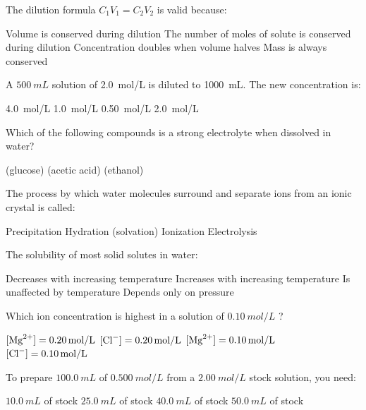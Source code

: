 \documentclass[addpoints]{exam}
\begin{document}
\begin{questions}
\question[1] The dilution formula $C_1V_1 = C_2V_2$ is valid because:
\begin{choices}
    \choice Volume is conserved during dilution
    \correctchoice The number of moles of solute is conserved during dilution
    \choice Concentration doubles when volume halves
    \choice Mass is always conserved
\end{choices}

\question[1] A $\SI{500}{mL}$ solution of \SI{2.0}{mol/L}  is diluted to
\SI{1000}{mL}. The new concentration is:
\begin{choices}
    \choice \SI{4.0}{mol/L}
    \correctchoice \SI{1.0}{mol/L}
    \choice \SI{0.50}{mol/L}
    \choice \SI{2.0}{mol/L}
\end{choices}

\question[1] Which of the following compounds is a strong electrolyte when dissolved in water?
\begin{choices}
    \choice {} (glucose)
    \choice {} (acetic acid)
    \correctchoice {}
    \choice {} (ethanol)
\end{choices}

\question[1] The process by which water molecules surround and separate ions from an ionic
crystal is called:
\begin{choices}
    \choice Precipitation
    \correctchoice Hydration (solvation)
    \choice Ionization
    \choice Electrolysis
\end{choices}

\question[1] The solubility of most solid solutes in water:
\begin{choices}
    \choice Decreases with increasing temperature
    \correctchoice Increases with increasing temperature
    \choice Is unaffected by temperature
    \choice Depends only on pressure
\end{choices}

\question[1] Which ion concentration is highest in a solution of $\SI{0.10}{mol/L}$
?
\begin{choices}
    \choice $[\ce{Mg^{2+}}] = \SI{0.20}{mol/L}$
    \correctchoice $[\ce{Cl-}] = \SI{0.20}{mol/L}$
    \choice $[\ce{Mg^{2+}}] = \SI{0.10}{mol/L}$
    \choice $[\ce{Cl-}] = \SI{0.10}{mol/L}$
\end{choices}

\question[1] To prepare $\SI{100.0}{mL}$ of $\SI{0.500}{mol/L}$  from a
$\SI{2.00}{mol/L}$ stock solution, you need:
\begin{choices}
    \choice $\SI{10.0}{mL}$ of stock
    \correctchoice $\SI{25.0}{mL}$ of stock
    \choice $\SI{40.0}{mL}$ of stock
    \choice $\SI{50.0}{mL}$ of stock
\end{choices}


\end{questions}
\end{document}
